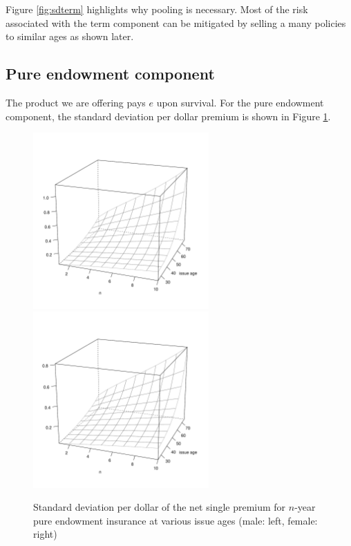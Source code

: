 \documentclass[12pt]{article}
\begin{document}
Figure \ref{fig:sdterm} highlights why pooling is necessary. Most of the risk associated with the term component can be mitigated by selling a many policies to similar ages as shown later.

\subsection{Pure endowment component}

The product we are offering pays $e$ upon survival. For the pure endowment component, the standard deviation per dollar premium is shown in Figure \ref{fig:sdpure}.

\begin{figure}[!ht]
\begin{center}
\vspace{-12mm}
\centerline{
\includegraphics[width=0.6\textwidth]{images/pureSDPlotMale}
\includegraphics[width=0.6\textwidth]{images/pureSDPlotFemale}}
\end{center}
\vspace{-10mm}
\caption{Standard deviation per dollar of the net single premium for $n$-year pure endowment insurance at various issue ages (male: left, female: right)}
\label{fig:sdpure}
\end{figure}
\end{document}
